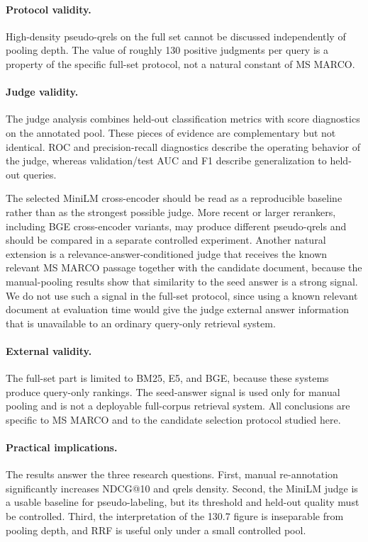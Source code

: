 \documentclass[runningheads,a4paper]{llncs}
\begin{document}
\paragraph{Protocol validity.}
High-density pseudo-qrels on the full set cannot be discussed independently of pooling depth. The value of roughly 130 positive judgments per query is a property of the specific full-set protocol, not a natural constant of MS MARCO.

\paragraph{Judge validity.}
The judge analysis combines held-out classification metrics with score diagnostics on the annotated pool. These pieces of evidence are complementary but not identical. ROC and precision-recall diagnostics describe the operating behavior of the judge, whereas validation/test AUC and F1 describe generalization to held-out queries.

The selected MiniLM cross-encoder should be read as a reproducible baseline rather than as the strongest possible judge. More recent or larger rerankers, including BGE cross-encoder variants, may produce different pseudo-qrels and should be compared in a separate controlled experiment. Another natural extension is a relevance-answer-conditioned judge that receives the known relevant MS MARCO passage together with the candidate document, because the manual-pooling results show that similarity to the seed answer is a strong signal. We do not use such a signal in the full-set protocol, since using a known relevant document at evaluation time would give the judge external answer information that is unavailable to an ordinary query-only retrieval system.

\paragraph{External validity.}
The full-set part is limited to BM25, E5, and BGE, because these systems produce query-only rankings. The seed-answer signal is used only for manual pooling and is not a deployable full-corpus retrieval system. All conclusions are specific to MS MARCO and to the candidate selection protocol studied here.

\paragraph{Practical implications.}
The results answer the three research questions. First, manual re-annotation significantly increases NDCG@10 and qrels density. Second, the MiniLM judge is a usable baseline for pseudo-labeling, but its threshold and held-out quality must be controlled. Third, the interpretation of the 130.7 figure is inseparable from pooling depth, and RRF is useful only under a small controlled pool.
\end{document}
